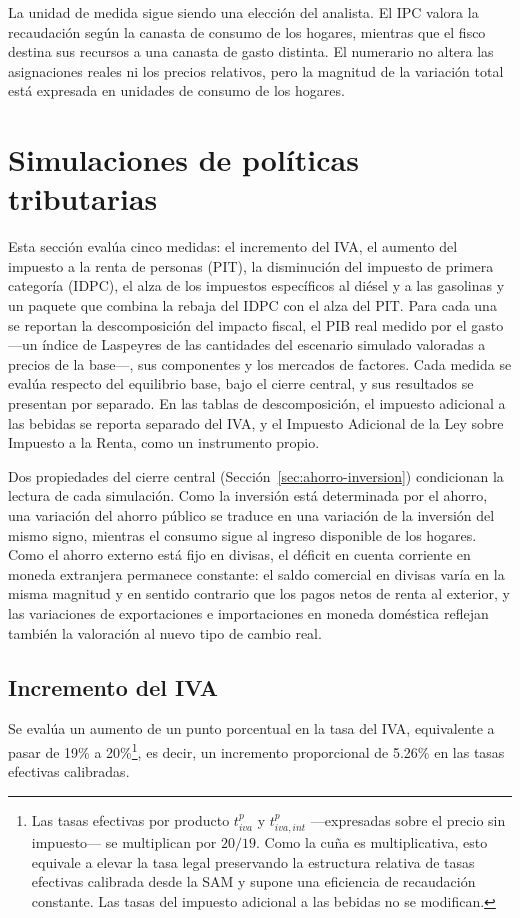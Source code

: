 \documentclass[11pt]{article}
\begin{document}
La unidad de medida sigue siendo una elección del analista. El IPC valora la recaudación según la canasta de consumo de los hogares, mientras que el fisco destina sus recursos a una canasta de gasto distinta. El numerario no altera las asignaciones reales ni los precios relativos, pero la magnitud de la variación total está expresada en unidades de consumo de los hogares.

\section{Simulaciones de políticas tributarias}
\label{sec:simulaciones}

Esta sección evalúa cinco medidas: el incremento del IVA, el aumento del impuesto a la renta de personas (PIT), la disminución del impuesto de primera categoría (IDPC), el alza de los impuestos específicos al diésel y a las gasolinas y un paquete que combina la rebaja del IDPC con el alza del PIT. Para cada una se reportan la descomposición del impacto fiscal, el PIB real medido por el gasto ---un índice de Laspeyres de las cantidades del escenario simulado valoradas a precios de la base---, sus componentes y los mercados de factores. Cada medida se evalúa respecto del equilibrio base, bajo el cierre central, y sus resultados se presentan por separado. En las tablas de descomposición, el impuesto adicional a las bebidas se reporta separado del IVA, y el Impuesto Adicional de la Ley sobre Impuesto a la Renta, como un instrumento propio.

Dos propiedades del cierre central (Sección~\ref{sec:ahorro-inversion}) condicionan la lectura de cada simulación. Como la inversión está determinada por el ahorro, una variación del ahorro público se traduce en una variación de la inversión del mismo signo, mientras el consumo sigue al ingreso disponible de los hogares. Como el ahorro externo está fijo en divisas, el déficit en cuenta corriente en moneda extranjera permanece constante: el saldo comercial en divisas varía en la misma magnitud y en sentido contrario que los pagos netos de renta al exterior, y las variaciones de exportaciones e importaciones en moneda doméstica reflejan también la valoración al nuevo tipo de cambio real.

\subsection{Incremento del IVA}
\label{sec:sim-iva}

Se evalúa un aumento de un punto porcentual en la tasa del IVA, equivalente a pasar de 19\% a 20\%\footnote{Las tasas efectivas por producto $t_{iva}^{p}$ y $t_{iva,int}^{p}$ ---expresadas sobre el precio sin impuesto--- se multiplican por $20/19$. Como la cuña es multiplicativa, esto equivale a elevar la tasa legal preservando la estructura relativa de tasas efectivas calibrada desde la SAM y supone una eficiencia de recaudación constante. Las tasas del impuesto adicional a las bebidas no se modifican.}, es decir, un incremento proporcional de 5.26\% en las tasas efectivas calibradas.
\end{document}

